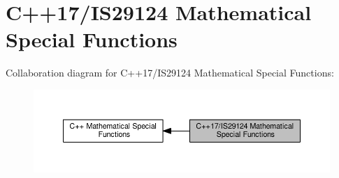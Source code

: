 \hypertarget{group__tr29124__math__spec__func}{}\section{C++17/\+I\+S29124 Mathematical Special Functions}
\label{group__tr29124__math__spec__func}
Collaboration diagram for C++17/\+I\+S29124 Mathematical Special Functions\+:
\nopagebreak
\begin{figure}[H]
\begin{center}
\leavevmode
\includegraphics[width=350pt]{group__tr29124__math__spec__func}
\end{center}
\end{figure}
